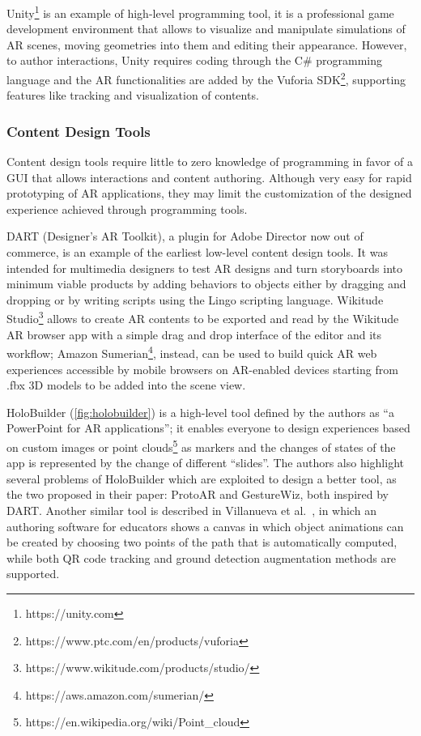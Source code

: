 Unity\footnote{https://unity.com} is an example of high-level programming tool, it is a professional game development environment that allows to visualize and manipulate simulations of AR scenes, moving geometries into them and editing their appearance. However, to author interactions, Unity requires coding through the C\# programming language and the AR functionalities are added by the Vuforia SDK\footnote{https://www.ptc.com/en/products/vuforia}, supporting features like tracking and visualization of contents.

\subsubsection{Content Design Tools}
\label{subsec:related-content-design-tools}
Content design tools require little to zero knowledge of programming in favor of a GUI that allows interactions and content authoring. Although very easy for rapid prototyping of AR applications, they may limit the customization of the designed experience achieved through programming tools.

DART (Designer's AR Toolkit), a plugin for Adobe Director now out of commerce, is an example of the earliest low-level content design tools. It was intended for multimedia designers to test AR designs and turn storyboards into minimum viable products by adding behaviors to objects either by dragging and dropping or by writing scripts using the Lingo scripting language. Wikitude Studio\footnote{https://www.wikitude.com/products/studio/} allows to create AR contents to be exported and read by the Wikitude AR browser app with a simple drag and drop interface of the editor and its workflow; Amazon Sumerian\footnote{https://aws.amazon.com/sumerian/}, instead, can be used to build quick AR web experiences accessible by mobile browsers on AR-enabled devices starting from .fbx 3D models to be added into the scene view.

HoloBuilder \cite{nebeling_trouble_2018} (\autoref{fig:holobuilder}) is a high-level tool defined by the authors as “a PowerPoint for AR applications”; it enables everyone to design experiences based on custom images or point clouds\footnote{https://en.wikipedia.org/wiki/Point\_cloud} as markers and the changes of states of the app is represented by the change of different “slides”. The authors also highlight several problems of HoloBuilder which are exploited to design a better tool, as the two proposed in their paper: ProtoAR and GestureWiz, both inspired by DART. Another similar tool is described in Villanueva et al.~\cite{villanueva_meta-ar-app_2020}, in which an authoring software for educators shows a canvas in which object animations can be created by choosing two points of the path that is automatically computed, while both QR code tracking and ground detection augmentation methods are supported.

